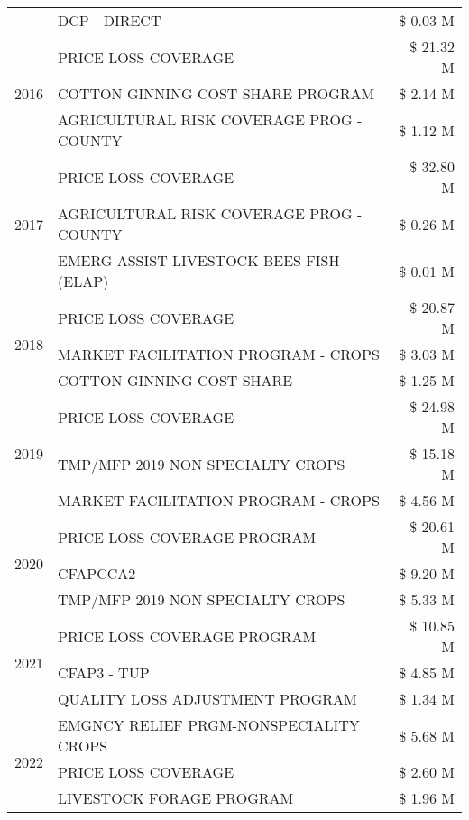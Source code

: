 \begin{tabular}{llr}
 & DCP - DIRECT & \$ 0.03 M \\
\cline{1-3}
\multirow[t]{3}{*}{2016} & PRICE LOSS COVERAGE & \$ 21.32 M \\
 & COTTON GINNING COST SHARE PROGRAM & \$ 2.14 M \\
 & AGRICULTURAL RISK COVERAGE PROG - COUNTY & \$ 1.12 M \\
\cline{1-3}
\multirow[t]{3}{*}{2017} & PRICE LOSS COVERAGE & \$ 32.80 M \\
 & AGRICULTURAL RISK COVERAGE PROG - COUNTY & \$ 0.26 M \\
 & EMERG ASSIST LIVESTOCK BEES FISH (ELAP) & \$ 0.01 M \\
\cline{1-3}
\multirow[t]{3}{*}{2018} & PRICE LOSS COVERAGE & \$ 20.87 M \\
 & MARKET FACILITATION PROGRAM - CROPS & \$ 3.03 M \\
 & COTTON GINNING COST SHARE & \$ 1.25 M \\
\cline{1-3}
\multirow[t]{3}{*}{2019} & PRICE LOSS COVERAGE & \$ 24.98 M \\
 & TMP/MFP 2019 NON SPECIALTY CROPS & \$ 15.18 M \\
 & MARKET FACILITATION PROGRAM - CROPS & \$ 4.56 M \\
\cline{1-3}
\multirow[t]{3}{*}{2020} & PRICE LOSS COVERAGE PROGRAM & \$ 20.61 M \\
 & CFAPCCA2 & \$ 9.20 M \\
 & TMP/MFP 2019 NON SPECIALTY CROPS & \$ 5.33 M \\
\cline{1-3}
\multirow[t]{3}{*}{2021} & PRICE LOSS COVERAGE PROGRAM & \$ 10.85 M \\
 & CFAP3 - TUP & \$ 4.85 M \\
 & QUALITY LOSS ADJUSTMENT PROGRAM & \$ 1.34 M \\
\cline{1-3}
\multirow[t]{3}{*}{2022} & EMGNCY RELIEF PRGM-NONSPECIALITY CROPS & \$ 5.68 M \\
 & PRICE LOSS COVERAGE & \$ 2.60 M \\
 & LIVESTOCK FORAGE PROGRAM & \$ 1.96 M \\
\cline{1-3}
\bottomrule
\end{tabular}
